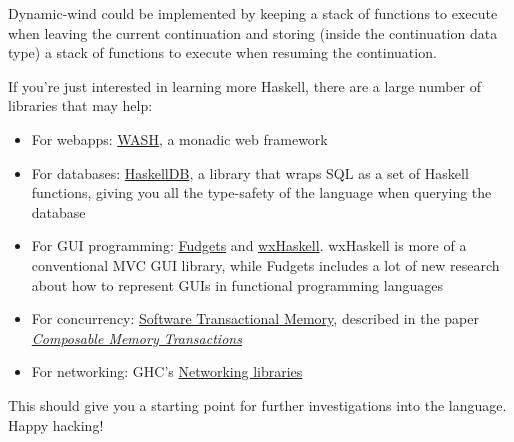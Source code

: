 Dynamic-wind could be implemented by keeping a stack of functions to execute when leaving the current continuation and storing (inside the continuation data type) a stack of functions to execute when resuming the continuation.
 
If you're just interested in learning more Haskell, there are a large number of libraries that may help:
 
\begin{itemize}
	\item For webapps: \href{http://www.informatik.uni-freiburg.de/~thiemann/haskell/WASH/}{WASH}, a monadic web framework
	\item For databases: \href{http://haskelldb.sourceforge.net/}{HaskellDB}, a library that wraps SQL as a set of Haskell functions, giving you all the type-safety of the language when querying the database
	\item For GUI programming: \href{http://www.md.chalmers.se/Cs/Research/Functional/Fudgets/}{Fudgets} and \href{http://wxhaskell.sourceforge.net/}{wxHaskell}. wxHaskell is more of a conventional MVC GUI library, while Fudgets includes a lot of new research about how to represent GUIs in functional programming languages
	\item For concurrency: \href{http://www.haskell.org/ghc/docs/6.4/html/libraries/stm/Control.Concurrent.STM.html}{Software Transactional Memory}, described in the paper \href{http://research.microsoft.com/~simonpj/papers/stm/stm.pdf}{\textit{Composable Memory Transactions}}
	\item For networking: GHC's \href{http://www.haskell.org/ghc/docs/6.4/html/libraries/network/Network.html}{Networking libraries}
\end{itemize}
 
This should give you a starting point for further investigations into the language. Happy hacking!
 
\thispagestyle{myheadings}
